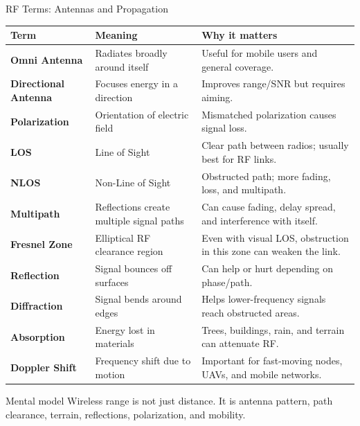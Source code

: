 \documentclass[aspectratio=169]{beamer}
\begin{document}
\begin{frame}{RF Terms: Antennas and Propagation}
\scriptsize
\begin{tabular}{p{2.0cm} p{3.4cm} p{6.7cm}}
\toprule
\textbf{Term} & \textbf{Meaning} & \textbf{Why it matters} \\
\midrule
\textbf{Omni Antenna} & Radiates broadly around itself & Useful for mobile users and general coverage. \\
\textbf{Directional Antenna} & Focuses energy in a direction & Improves range/SNR but requires aiming. \\
\textbf{Polarization} & Orientation of electric field & Mismatched polarization causes signal loss. \\
\textbf{LOS} & Line of Sight & Clear path between radios; usually best for RF links. \\
\textbf{NLOS} & Non-Line of Sight & Obstructed path; more fading, loss, and multipath. \\
\textbf{Multipath} & Reflections create multiple signal paths & Can cause fading, delay spread, and interference with itself. \\
\textbf{Fresnel Zone} & Elliptical RF clearance region & Even with visual LOS, obstruction in this zone can weaken the link. \\
\textbf{Reflection} & Signal bounces off surfaces & Can help or hurt depending on phase/path. \\
\textbf{Diffraction} & Signal bends around edges & Helps lower-frequency signals reach obstructed areas. \\
\textbf{Absorption} & Energy lost in materials & Trees, buildings, rain, and terrain can attenuate RF. \\
\textbf{Doppler Shift} & Frequency shift due to motion & Important for fast-moving nodes, UAVs, and mobile networks. \\
\bottomrule
\end{tabular}

\vspace{0.15cm}
\begin{block}{Mental model}
Wireless range is not just distance. It is antenna pattern, path clearance, terrain, reflections, polarization, and mobility.
\end{block}
\end{frame}
\end{document}
